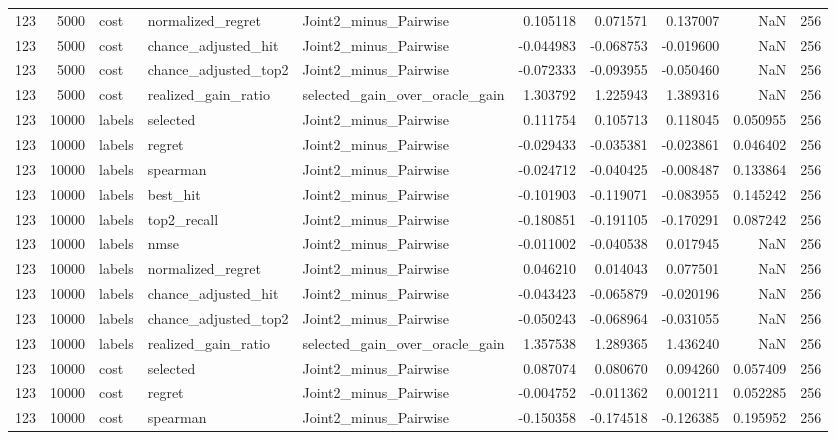 \begin{tabular}{rrlllrrrrr}
123 & 5000 & cost & normalized_regret & Joint2_minus_Pairwise & 0.105118 & 0.071571 & 0.137007 & NaN & 256 \\
123 & 5000 & cost & chance_adjusted_hit & Joint2_minus_Pairwise & -0.044983 & -0.068753 & -0.019600 & NaN & 256 \\
123 & 5000 & cost & chance_adjusted_top2 & Joint2_minus_Pairwise & -0.072333 & -0.093955 & -0.050460 & NaN & 256 \\
123 & 5000 & cost & realized_gain_ratio & selected_gain_over_oracle_gain & 1.303792 & 1.225943 & 1.389316 & NaN & 256 \\
123 & 10000 & labels & selected & Joint2_minus_Pairwise & 0.111754 & 0.105713 & 0.118045 & 0.050955 & 256 \\
123 & 10000 & labels & regret & Joint2_minus_Pairwise & -0.029433 & -0.035381 & -0.023861 & 0.046402 & 256 \\
123 & 10000 & labels & spearman & Joint2_minus_Pairwise & -0.024712 & -0.040425 & -0.008487 & 0.133864 & 256 \\
123 & 10000 & labels & best_hit & Joint2_minus_Pairwise & -0.101903 & -0.119071 & -0.083955 & 0.145242 & 256 \\
123 & 10000 & labels & top2_recall & Joint2_minus_Pairwise & -0.180851 & -0.191105 & -0.170291 & 0.087242 & 256 \\
123 & 10000 & labels & nmse & Joint2_minus_Pairwise & -0.011002 & -0.040538 & 0.017945 & NaN & 256 \\
123 & 10000 & labels & normalized_regret & Joint2_minus_Pairwise & 0.046210 & 0.014043 & 0.077501 & NaN & 256 \\
123 & 10000 & labels & chance_adjusted_hit & Joint2_minus_Pairwise & -0.043423 & -0.065879 & -0.020196 & NaN & 256 \\
123 & 10000 & labels & chance_adjusted_top2 & Joint2_minus_Pairwise & -0.050243 & -0.068964 & -0.031055 & NaN & 256 \\
123 & 10000 & labels & realized_gain_ratio & selected_gain_over_oracle_gain & 1.357538 & 1.289365 & 1.436240 & NaN & 256 \\
123 & 10000 & cost & selected & Joint2_minus_Pairwise & 0.087074 & 0.080670 & 0.094260 & 0.057409 & 256 \\
123 & 10000 & cost & regret & Joint2_minus_Pairwise & -0.004752 & -0.011362 & 0.001211 & 0.052285 & 256 \\
123 & 10000 & cost & spearman & Joint2_minus_Pairwise & -0.150358 & -0.174518 & -0.126385 & 0.195952 & 256 \\

\end{tabular}
